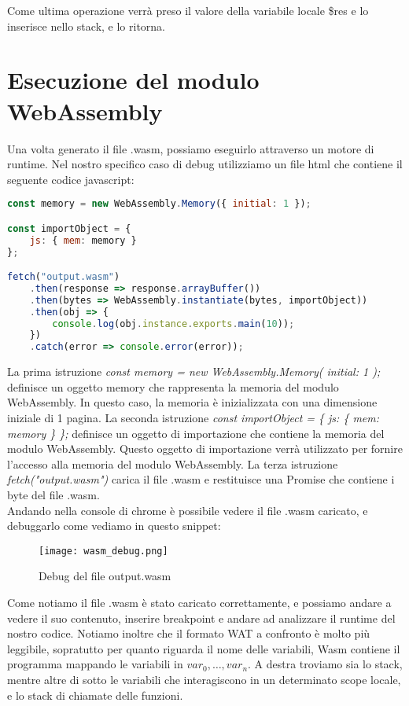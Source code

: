 \documentclass[../../main.tex]{subfiles}
\begin{document}
Come ultima operazione verrà preso il valore della variabile locale \$res e lo inserisce nello stack, e lo ritorna.

\section{Esecuzione del modulo WebAssembly}
Una volta generato il file .wasm, possiamo eseguirlo attraverso un motore di runtime. Nel nostro specifico caso di debug utilizziamo un file html che contiene il seguente codice javascript:
\begin{lstlisting}[language=Javascript, caption={Esecuzione del modulo WebAssembly}, label={lst:esecuzioneWasm}]
const memory = new WebAssembly.Memory({ initial: 1 });

const importObject = {
    js: { mem: memory }
};

fetch("output.wasm")
    .then(response => response.arrayBuffer())
    .then(bytes => WebAssembly.instantiate(bytes, importObject))
    .then(obj => {
        console.log(obj.instance.exports.main(10));
    })
    .catch(error => console.error(error));

\end{lstlisting}

La prima istruzione \textit{const memory = new WebAssembly.Memory({ initial: 1 });} definisce un oggetto memory che rappresenta la memoria del modulo WebAssembly. In questo caso, la memoria è inizializzata con una dimensione iniziale di 1 pagina.
La seconda istruzione \textit{const importObject = \{ js: \{ mem: memory \} \};} definisce un oggetto di importazione che contiene la memoria del modulo WebAssembly. Questo oggetto di importazione verrà utilizzato per fornire l'accesso alla memoria del modulo WebAssembly.
La terza istruzione \textit{fetch("output.wasm")} carica il file .wasm e restituisce una Promise che contiene i byte del file .wasm.\\
Andando nella console di chrome è possibile vedere il file .wasm caricato, e debuggarlo come vediamo in questo snippet:
\begin{figure}[H]
    \centering
    \texttt{[image: wasm\_debug.png]}
    \caption{Debug del file output.wasm}
    \label{fig:wasm_debug}
\end{figure}
Come notiamo il file .wasm è stato caricato correttamente, e possiamo andare a vedere il suo contenuto, inserire breakpoint e andare ad analizzare il runtime del nostro codice.
Notiamo inoltre che il formato WAT a confronto è molto più leggibile, sopratutto per quanto riguarda il nome delle variabili, Wasm contiene il programma mappando le variabili in $var_0,\dots, var_n$.
A destra troviamo sia lo stack, mentre altre di sotto le variabili che interagiscono in un determinato scope locale, e lo stack di chiamate delle funzioni.
\end{document}
